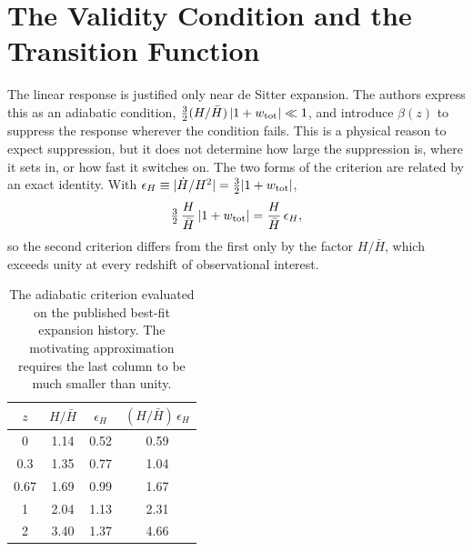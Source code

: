\documentclass[11pt]{article}
\newcommand{\Hb}{\bar H}
\begin{document}
\section{The Validity Condition and the Transition Function}

The linear response is justified only near de Sitter expansion. The authors express this as an adiabatic condition, $\tfrac32 (H/\Hb)\,|1+w_{\rm tot}|\ll 1$, and introduce $\beta(z)$ to suppress the response wherever the condition fails. This is a physical reason to expect suppression, but it does not determine how large the suppression is, where it sets in, or how fast it switches on. The two forms of the criterion are related by an exact identity. With $\epsilon_H\equiv|\dot H/H^2|=\tfrac32|1+w_{\rm tot}|$,
\begin{equation}
\tfrac32\,\frac{H}{\Hb}\,|1+w_{\rm tot}|=\frac{H}{\Hb}\,\epsilon_H,
\end{equation}
so the second criterion differs from the first only by the factor $H/\Hb$, which exceeds unity at every redshift of observational interest.

\begin{table}[h]
\centering
\begin{tabular}{cccc}
\toprule
$z$ & $H/\Hb$ & $\epsilon_H$ & $(H/\Hb)\,\epsilon_H$\\
\midrule
0 & 1.14 & 0.52 & 0.59\\
0.3 & 1.35 & 0.77 & 1.04\\
0.67 & 1.69 & 0.99 & 1.67\\
1 & 2.04 & 1.13 & 2.31\\
2 & 3.40 & 1.37 & 4.66\\
\bottomrule
\end{tabular}
\caption{The adiabatic criterion evaluated on the published best-fit expansion history. The motivating approximation requires the last column to be much smaller than unity.}
\end{table}
\end{document}
